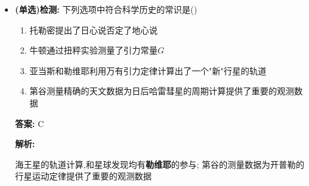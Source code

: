 \documentclass{article}
\begin{document}
\begin{itemize}
\begin{enumerate}
                    \hspace{-1em}\begin{adjustbox}{minipage=0.91\linewidth, bgcolor=gray!20, padding=1em}
                        \small %
                        石英丝连接细杆,两端放置等大质量球,在两球附近放置两大质量球产生引力矩,用光线反射法放大扭转

                        \vspace{-1em}

                        $$ \theta \propto \text{力矩} \quad \lra  \quad k\theta = 2F_{G}L \quad (k\text{为比例系数需提前测量}) $$
                    \end{adjustbox}

                    \vspace{-1em}

              \item 亚当斯和勒维耶利用万有引力定律计算出了"新"行星的轨道
              \item 伽勒和勒维耶发现了这颗行星,后被命名为海王星
              \item 哈雷利用万有引力预言了同一彗星的按时回归,后被命名为"哈雷彗星"
              \item 钱学森被誉为"中国航天之父",地球同步卫星的(赤道)轨道高度$36000km$
              \item 阿姆斯特朗:人类登月第一人 \quad 杨利伟:中国登月第一人
          \end{enumerate}

          \vspace{0.5em}

    \item[] \textbf{(单选)检测:} 下列选项中符合科学历史的常识是(\qquad)

        \begin{enumerate}[label=\Alph*.]
            \item 托勒密提出了日心说否定了地心说
            \item 牛顿通过扭秤实验测量了引力常量$G$
            \item 亚当斯和勒维耶利用万有引力定律计算出了一个"新"行星的轨道
            \item 第谷测量精确的天文数据为日后哈雷彗星的周期计算提供了重要的观测数据
        \end{enumerate}

        \textbf{答案:} C

        \textbf{解析:}

        \hspace{2em}海王星的轨道计算,和星球发现均有\textbf{勒维耶}的参与;
        第谷的测量数据为开普勒的行星运动定律提供了重要的观测数据


\end{itemize}
\end{document}

